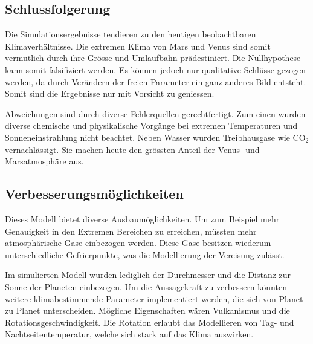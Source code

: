 \begin{refsection}
\section{Schlussfolgerung}

Die Simulationsergebnisse tendieren zu den heutigen beobachtbaren Klimaverhältnisse. Die extremen Klima von Mars und Venus sind somit vermutlich durch ihre Grösse und Umlaufbahn prädestiniert. Die Nullhypothese kann somit falsifiziert werden. Es können jedoch nur qualitative Schlüsse gezogen werden, da durch Verändern der freien Parameter ein ganz anderes Bild entsteht. Somit sind die Ergebnisse nur mit Vorsicht zu geniessen.

Abweichungen sind durch diverse Fehlerquellen gerechtfertigt. Zum einen wurden diverse chemische und physikalische Vorgänge bei extremen Temperaturen und Sonneneinstrahlung nicht beachtet.
Neben Wasser wurden Treibhausgase wie CO$_2$ vernachlässigt. Sie machen heute den grössten Anteil der Venus- und Marsatmosphäre aus.

\subsection{Verbesserungsmöglichkeiten}

Dieses Modell bietet diverse Ausbaumöglichkeiten. Um zum Beispiel mehr Genauigkeit in den Extremen Bereichen zu erreichen, müssten mehr atmosphärische Gase einbezogen werden.
Diese Gase besitzen wiederum unterschiedliche Gefrierpunkte, was die Modellierung der Vereisung zulässt.
		
Im simulierten Modell wurden lediglich der Durchmesser und die Distanz zur Sonne der Planeten einbezogen. Um die Aussagekraft zu verbessern könnten weitere klimabestimmende Parameter implementiert werden, die sich von Planet zu Planet unterscheiden. Mögliche Eigenschaften wären Vulkanismus und die Rotationsgeschwindigkeit. Die Rotation erlaubt das Modellieren von Tag- und Nachtseitentemperatur, welche sich stark auf das Klima auswirken.

\printbibliography[heading=subbibliography]
\end{refsection}
